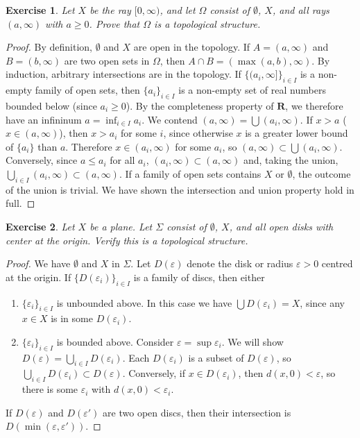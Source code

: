 \documentclass{report}
\theoremstyle{plain}
\newtheorem{exercise}{Exercise}[section]
\theoremstyle{definition}
\begin{document}
\begin{exercise}
    Let $X$ be the ray $[0,\infty)$, and let $\Omega$ consist of $\emptyset$, $X$, and all rays $(a,\infty)$ with $a \geq 0$. Prove that $\Omega$ is a topological structure.
\end{exercise}
\begin{proof}
    By definition, $\emptyset$ and $X$ are open in the topology. If $A = (a, \infty)$ and $B = (b, \infty)$ are two open sets in $\Omega$, then $A \cap B = (\max(a,b), \infty)$. By induction, arbitrary intersections are in the topology. If $\{(a_i, \infty]\}_{i \in I}$ is a non-empty family of open sets, then $\{a_i\}_{i \in I}$ is a non-empty set of real numbers bounded below (since $a_i \geq 0$). By the completeness property of $\mathbf{R}$, we therefore have an infininum $a = \inf_{i \in I} a_i$. We contend $(a, \infty) = \bigcup (a_i, \infty)$. If $x > a$ ($x \in (a,\infty)$), then $x > a_i$ for some $i$, since otherwise $x$ is a greater lower bound of $\{a_i\}$ than $a$. Therefore $x \in (a_i, \infty)$ for some $a_i$, so $(a,\infty) \subset \bigcup (a_i,\infty)$. Conversely, since $a \leq a_i$ for all $a_i$, $(a_i,\infty) \subset (a, \infty)$ and, taking the union, $\bigcup_{i \in I} (a_i, \infty) \subset (a, \infty)$. If a family of open sets contains $X$ or $\emptyset$, the outcome of the union is trivial. We have shown the intersection and union property hold in full.
\end{proof}

\begin{exercise}
    Let $X$ be a plane. Let $\Sigma$ consist of $\emptyset$, $X$, and all open disks with center at the origin. Verify this is a topological structure.
\end{exercise}
\begin{proof}
    We have $\emptyset$ and $X$ in $\Sigma$. Let $D(\varepsilon)$ denote the disk or radius $\varepsilon > 0$ centred at the origin. If $\{D(\varepsilon_i)\}_{i \in I}$ is a family of discs, then either
    \begin{enumerate}
        \item $\{\varepsilon_i\}_{i \in I}$ is unbounded above. In this case we have $\bigcup D(\varepsilon_i) = X$, since any $x \in X$ is in some $D(\varepsilon_i)$.
        \item $\{\varepsilon_i\}_{i \in I}$ is bounded above. Consider $\varepsilon = \sup \varepsilon_i$. We will show $D(\varepsilon) = \bigcup_{i \in I} D(\varepsilon_i)$. Each $D(\varepsilon_i)$ is a subset of $D(\varepsilon)$, so $\bigcup_{i \in I} D(\varepsilon_i) \subset D(\varepsilon)$. Conversely, if $x \in D(\varepsilon_i)$, then $d(x,0) < \varepsilon$, so there is some $\varepsilon_i$ with $d(x,0) < \varepsilon_i$.
    \end{enumerate}
    If $D(\varepsilon)$ and $D(\varepsilon')$ are two open discs, then their intersection is $D(\min(\varepsilon, \varepsilon'))$.
\end{proof}
\end{document}
